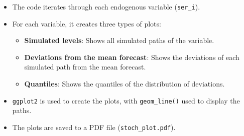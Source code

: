 \documentclass[
  letterpaper,
  DIV=11,
  numbers=noendperiod]{scrreport}
\newenvironment{Shaded}{\begin{snugshade}}{\end{snugshade}}
\newcommand{\AttributeTok}[1]{\textcolor[rgb]{0.40,0.45,0.13}{#1}}
\newcommand{\CommentTok}[1]{\textcolor[rgb]{0.37,0.37,0.37}{#1}}
\newcommand{\ConstantTok}[1]{\textcolor[rgb]{0.56,0.35,0.01}{#1}}
\newcommand{\ControlFlowTok}[1]{\textcolor[rgb]{0.00,0.23,0.31}{\textbf{#1}}}
\newcommand{\DecValTok}[1]{\textcolor[rgb]{0.68,0.00,0.00}{#1}}
\newcommand{\FloatTok}[1]{\textcolor[rgb]{0.68,0.00,0.00}{#1}}
\newcommand{\FunctionTok}[1]{\textcolor[rgb]{0.28,0.35,0.67}{#1}}
\newcommand{\NormalTok}[1]{\textcolor[rgb]{0.00,0.23,0.31}{#1}}
\newcommand{\OtherTok}[1]{\textcolor[rgb]{0.00,0.23,0.31}{#1}}
\newcommand{\SpecialCharTok}[1]{\textcolor[rgb]{0.37,0.37,0.37}{#1}}
\newcommand{\StringTok}[1]{\textcolor[rgb]{0.13,0.47,0.30}{#1}}
\providecommand{\tightlist}{%
  \setlength{\itemsep}{0pt}\setlength{\parskip}{0pt}}\usepackage{longtable,booktabs,array}
\begin{document}
\begin{Shaded}
\end{Shaded}

\begin{itemize}
\tightlist
\item
  The code iterates through each endogenous variable (\texttt{ser\_i}).
\item
  For each variable, it creates three types of plots:

  \begin{itemize}
  \tightlist
  \item
    \textbf{Simulated levels}: Shows all simulated paths of the
    variable.
  \item
    \textbf{Deviations from the mean forecast}: Shows the deviations of
    each simulated path from the mean forecast.
  \item
    \textbf{Quantiles}: Shows the quantiles of the distribution of
    deviations.
  \end{itemize}
\item
  \texttt{ggplot2} is used to create the plots, with
  \texttt{geom\_line()} used to display the paths.
\item
  The plots are saved to a PDF file (\texttt{stoch\_plot.pdf}).
\end{itemize}
\end{document}
